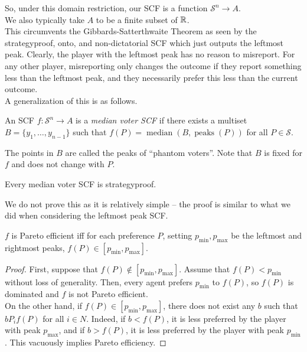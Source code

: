 		So, under this domain restriction, our SCF is a function $\mathcal{S}^n \to A$.\\
		We also typically take $A$ to be a finite subset of $\mathbb{R}$.\\
		This circumvents the Gibbards-Satterthwaite Theorem as seen by the strategyproof, onto, and non-dictatorial SCF which just outputs the leftmost peak. Clearly, the player with the leftmost peak has no reason to misreport. For any other player, misreporting only changes the outcome if they report something less than the leftmost peak, and they necessarily prefer this less than the current outcome.\\
		A generalization of this is as follows.

		\begin{fdef}
			An SCF $f : \mathcal{S}^n \to A$ is a \emph{median voter SCF} if there exists a multiset $B = \{y_1,\ldots,y_{n-1}\}$ such that $f(P) = \operatorname{median}(B,\operatorname{peaks}(P))$ for all $P \in \mathcal{S}$.
		\end{fdef}

		The points in $B$ are called the peaks of ``phantom voters''. Note that $B$ is fixed for $f$ and does not change with $P$.

		\begin{flem}[Moulin 1980]
			\label{lem: median stratproof}
			Every median voter SCF is strategyproof.
		\end{flem}

		We do not prove this as it is relatively simple -- the proof is similar to what we did when considering the leftmost peak SCF.

		\begin{fprop}
			\label{prop: singlepeaked pareto efficient characterization}
			$f$ is Pareto efficient iff for each preference $P$, setting $p_{\min},p_{\max}$ be the leftmost and rightmost peaks, $f(P) \in [p_{\min},p_{\max}]$.
		\end{fprop}

		\begin{proof}
			First, suppose that $f(P) \not\in [p_{\min},p_{\max}]$. Assume that $f(P) < p_{\min}$ without loss of generality. Then, every agent prefers $p_{\min}$ to $f(P)$, so $f(P)$ is dominated and $f$ is not Pareto efficient.\\
			On the other hand, if $f(P) \in [p_{\min},p_{\max}]$, there does not exist any $b$ such that $b P_i f(P)$ for all $i \in N$. Indeed, if $b < f(P)$, it is less preferred by the player with peak $p_{\max}$, and if $b > f(P)$, it is less preferred by the player with peak $p_{\min}$. This vacuously implies Pareto efficiency.
		\end{proof}

